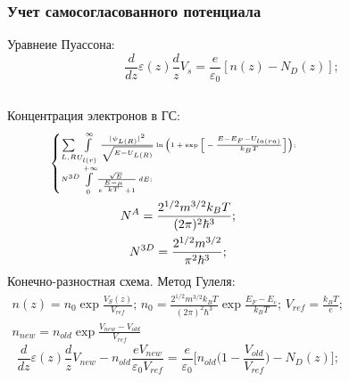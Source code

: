 \documentclass[10pt,pdf,hyperref={unicode},aspectratio={169}]{beamer}
\begin{document}
\begin{frame}
	\frametitle{Учет самосогласованного потенциала}
	{\color{blue}Уравнеие Пуассона:}
	\begin{equation*}
		\frac{d}{dz}\varepsilon(z)\frac{d}{z}V_{s} = \frac{e}{\varepsilon_{0}}[n(z) - N_{D}(z)];
	\end{equation*}

\begin{columns}
	{\color{red}Концентрация электронов в ГС:}
	\footnotesize
	\begin{gather*}
		{\tiny \begin{cases}
					\sum\limits_{L,R}\int\limits_{U_{l(r)}}^{\infty} \frac{|\psi_{L(R)}|^{2}}{\sqrt{E - U_{L(R)}}} \ln \bigg( 1 + \exp\bigg[ -\frac{E - E_{F} - U_{la(ra)}}{k_{B}T} \bigg] \bigg);\\
					N^{3D} \int\limits_{0}^{+\infty}\! \frac{\sqrt[]{E}}{e^{\frac{E-\mu}{kT}}+1} \,dE;
				\end{cases}}\\
		N^{A} = \frac{2^{1/2}m^{3/2}k_{B}T}{(2\pi)^{2}\hbar^{3}};\\
		N^{3D} = \frac{2^{1/2}m^{3/2}}{\pi^{2}\hbar^{3}}; 
	\end{gather*}
	{\color{red}Конечно-разностная схема. Метод Гулеля:}
	\tiny
	\begin{gather*}
	n(z) = n_{0}\exp\frac{V_{S}(z)}{V_{ref}};\,
	n_{0} = \frac{2^{1/2}m^{3/2}k_{B}T}{(2\pi)^{2}\hbar^{3}} \exp \frac{E_{F} - E_{c} }{k_{B}T};\,
	V_{ref} = \frac{k_{B}T}{e};\\
	n_{new} = n_{old}\exp\frac{V_{new} - V_{old}}{V_{ref}}
\end{gather*}
\begin{equation*}
	\frac{d}{dz}\varepsilon(z)\frac{d}{z}V_{new} - n_{old}\frac{eV_{new}}{\varepsilon_{0}V_{ref}} = \frac{e}{\varepsilon_{0}}\bigg[n_{old}\bigg( 1 - \frac{V_{old}}{V_{ref}} \bigg) - N_{D}(z)\bigg];
\end{equation*}
\end{columns}
\end{frame}
\end{document}
